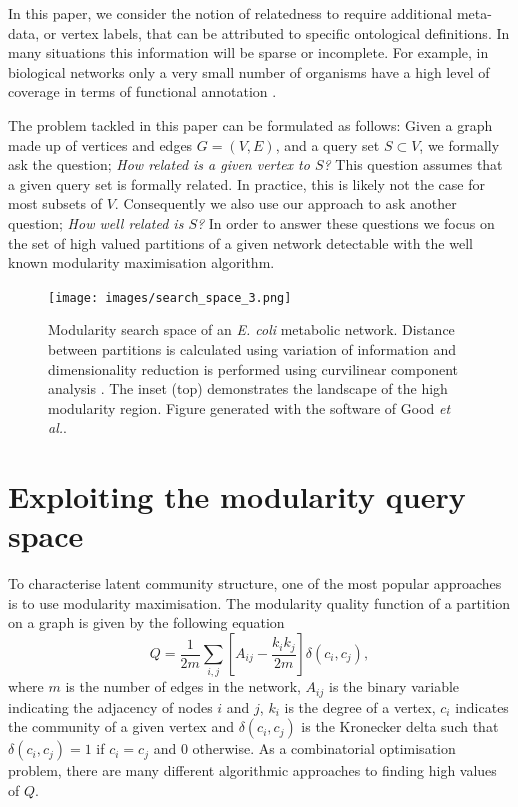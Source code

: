\documentclass[sigconf]{acmart}
\begin{document}
In this paper, we consider the notion of relatedness to require additional meta-data, or vertex labels, that can be attributed to specific ontological definitions.
In many situations this information will be sparse or incomplete.
For example, in biological networks only a very small number of organisms have a high level of coverage in terms of functional annotation \cite{bassel2012systems}.

The problem tackled in this paper can be formulated as follows:
Given a graph made up of vertices and edges $G = (V, E)$, and a query set $S \subset V$, we formally ask the question; \textit{How related is a given vertex to $S$?}
This question assumes that a given query set is formally related.
In practice, this is likely not the case for most subsets of $V$.
Consequently we also use our approach to ask another question; \textit{How well related is $S$?}
In order to answer these questions we focus on the set of high valued partitions of a given network detectable with the well known modularity maximisation algorithm.

\begin{figure}[t]
    \texttt{[image: images/search\_space\_3.png]}
    \caption{Modularity search space of an \textit{E. coli} metabolic network.
 Distance between partitions is calculated using variation of information \cite{meilua2003comparing} and dimensionality reduction is performed using curvilinear component analysis \cite{demartines1997curvilinear}.
  The inset (top) demonstrates the landscape of the high modularity region. 
  Figure generated with the software of Good \textit{et al.}\cite{good2010performance}.}
    \label{fig:modular_search_space}
\end{figure}

\section{Exploiting the modularity query space}
To characterise latent community structure, one of the most popular approaches is to use modularity maximisation.
The modularity quality function of a partition on a graph is given by the following equation \cite{newman2004}
\begin{equation}\label{eq:modularity}
  Q = \frac{1}{2m}\sum_{i,j} \left[A_{ij} - \frac{k_i k_j}{2m}\right]\delta(c_i, c_j),
\end{equation}
where $m$ is the number of edges in the network, $A_{ij}$ is the binary variable indicating the adjacency of nodes $i$ and $j$, $k_i$ is the degree of a vertex, $c_i$ indicates the community of a given vertex and $\delta(c_i, c_j)$ is the Kronecker delta such that $\delta(c_i, c_j) = 1$ if $c_i = c_j$ and $0$ otherwise.
As a combinatorial optimisation problem, there are many different algorithmic approaches to finding high values of $Q$.
\end{document}
